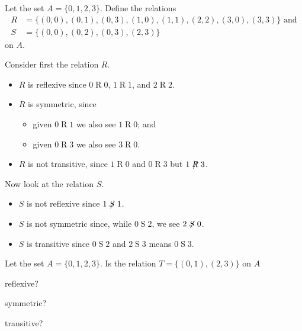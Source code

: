 \begin{example}
    Let the set $A = \{0,1,2,3\}$. Define the relations
    \begin{align*}
        R &= \{(0,0),(0,1),(0,3),(1,0),(1,1),(2,2),(3,0),(3,3)\} \text{ and}\\
        S &= \{(0,0),(0,2),(0,3),(2,3)\}
    \end{align*}
    on $A$.

    Consider first the relation $R$.
    \begin{itemize}
        \item $R$ is reflexive since $0\mathrel{R}0$, $1\mathrel{R}1$, and $2\mathrel{R}2$.
        \item $R$ is symmetric, since
        \begin{itemize}
            \item given $0\mathrel{R}1$ we also see $1\mathrel{R}0$; and
            \item given $0\mathrel{R}3$ we also see $3\mathrel{R}0$.
        \end{itemize}
        \item $R$ is not transitive, since $1\mathrel{R}0$ and $0\mathrel{R}3$ but $1\not\mathrel{R}3$.
    \end{itemize}

    Now look at the relation $S$.
    \begin{itemize}
        \item $S$ is not reflexive since $1\not\mathrel{S}1$.
        \item $S$ is not symmetric since, while $0\mathrel{S}2$, we see $2\not\mathrel{S}0$.
        \item $S$ is transitive since $0\mathrel{S}2$ and $2\mathrel{S}3$ means $0\mathrel{S}3$.
    \end{itemize}
\end{example}

\begin{exercise}
    Let the set $A = \{0, 1, 2, 3\}$. Is the relation $T = \{(0, 1), (2, 3)\}$ on $A$
        \begin{partquestions}{\alph*}
            \item reflexive?
            \item symmetric?
            \item transitive?
        \end{partquestions}
\end{exercise}

